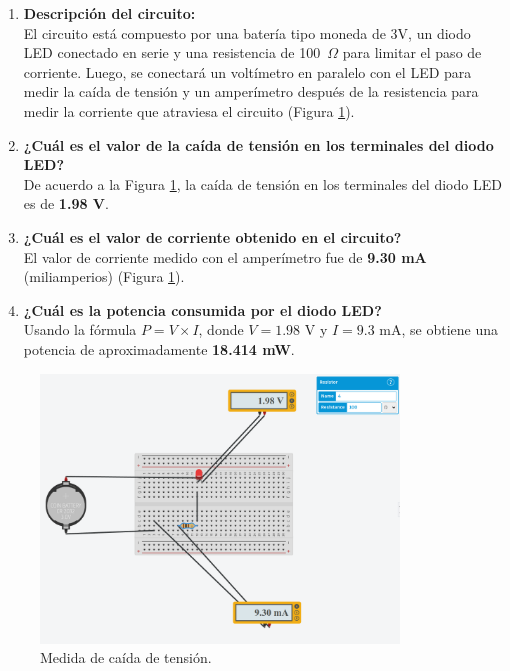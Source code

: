 \documentclass{article}
\begin{document}
\begin{enumerate}
    \item \textbf{Descripción del circuito:} \\
    El circuito est\'a compuesto por una bater\'ia tipo moneda de 3V, un diodo LED conectado en serie y una resistencia de 100~$\Omega$ para limitar el paso de corriente. Luego, se conectar\'a un volt\'imetro en paralelo con el LED para medir la ca\'ida de tensión y un amper\'imetro después de la resistencia para medir la corriente que atraviesa el circuito (Figura \ref{fig:caida_tension}).

    \item \textbf{¿Cu\'al es el valor de la ca\'ida de tensión en los terminales del diodo LED?} \\
    De acuerdo a la Figura \ref{fig:caida_tension}, la ca\'ida de tensión en los terminales del diodo LED es de \textbf{1.98 V}.

    \item \textbf{¿Cu\'al es el valor de corriente obtenido en el circuito?} \\
    El valor de corriente medido con el amper\'imetro fue de \textbf{9.30 mA} (miliamperios) (Figura \ref{fig:caida_tension}).

    \item \textbf{¿Cu\'al es la potencia consumida por el diodo LED?} \\
    Usando la fórmula $P = V \times I$, donde $V = 1.98$ V y $I = 9.3$ mA, se obtiene una potencia de aproximadamente \textbf{18.414 mW}.
\end{enumerate}

\begin{figure}[H]
    \centering
    \includegraphics[width=0.85\textwidth]{./img/ckpt_1_1.png}
    \caption{Medida de ca\'ida de tensión.}
    \label{fig:caida_tension}
\end{figure}
\end{document}

